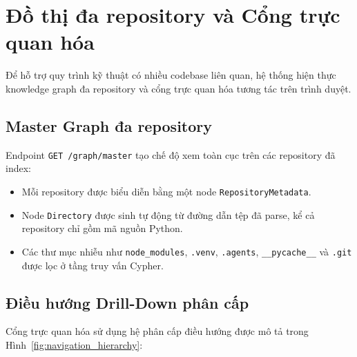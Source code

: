 \documentclass[12pt,a4paper,oneside]{report}
\begin{document}
\section{Đồ thị đa repository và Cổng trực quan hóa}
\label{sec:visualization}
Để hỗ trợ quy trình kỹ thuật có nhiều codebase liên quan, hệ thống hiện thực knowledge graph đa repository và cổng trực quan hóa tương tác trên trình duyệt.

\subsection{Master Graph đa repository}
Endpoint \texttt{GET /graph/master} tạo chế độ xem toàn cục trên các repository đã index:
\begin{itemize}
    \item Mỗi repository được biểu diễn bằng một node \texttt{RepositoryMetadata}.
    \item Node \texttt{Directory} được sinh tự động từ đường dẫn tệp đã parse, kể cả repository chỉ gồm mã nguồn Python.
    \item Các thư mục nhiễu như \texttt{node\_modules}, \texttt{.venv}, \texttt{.agents}, \texttt{\_\_pycache\_\_} và \texttt{.git} được lọc ở tầng truy vấn Cypher.
\end{itemize}

\subsection{Điều hướng Drill-Down phân cấp}
Cổng trực quan hóa sử dụng hệ phân cấp điều hướng được mô tả trong Hình~\ref{fig:navigation_hierarchy}:
\end{document}
